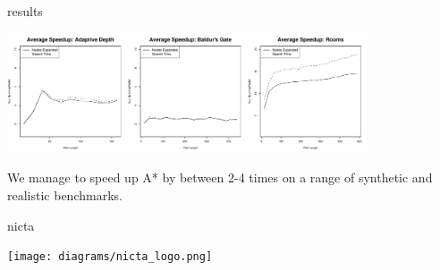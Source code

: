 \documentclass[a0,landscape]{a0poster}
\begin{document}
\begin{staticcontents*}{results}
\begin{staticfigure}
\label{fig:speedup}
\begin{center}
\includegraphics[width=0.8\textwidth, trim=20mm 0mm 40mm 0mm]{diagrams/speedup}
\vspace{-1em}
\caption{We manage to speed up A* by between 2-4 times on a range of synthetic
and realistic benchmarks.}
\end{center}
\end{staticfigure}
\end{staticcontents*}

\begin{staticcontents*}{nicta}
\begin{staticfigure}
\begin{center}
\texttt{[image: diagrams/nicta\_logo.png]}
\end{center}
\end{staticfigure}
\end{staticcontents*}








\end{document}
